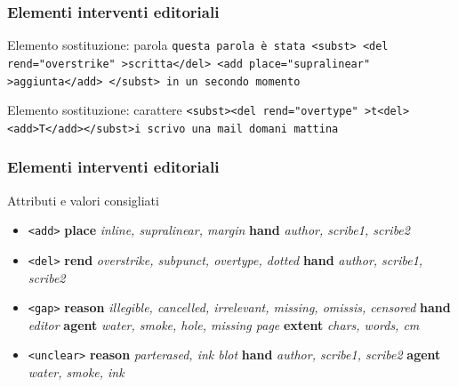 \begin{frame}
    \frametitle{Elementi interventi editoriali}
    \addtocounter{nframe}{1}
    

    \begin{block}{Elemento sostituzione: parola}
        \texttt{questa parola è stata <subst> <del rend="overstrike" >scritta</del> <add place="supralinear" >aggiunta</add> </subst> in un secondo momento}
    \end{block}

    \begin{block}{Elemento sostituzione: carattere}
        \texttt{<subst><del rend="overtype" >t<del><add>T</add></subst>i scrivo una     mail domani mattina}
    \end{block}
   
\end{frame}




\begin{frame}
    \frametitle{Elementi interventi editoriali}
    \addtocounter{nframe}{1}
    

    \begin{block}{Attributi e valori consigliati}
        \begin{itemize}
            \item \texttt{<add>} \textbf{place} \textit{inline, supralinear, margin} \textbf{hand} \textit{author, scribe1, scribe2}
            \item \texttt{<del>} \textbf{rend} \textit{overstrike, subpunct, overtype, dotted} \textbf{hand} \textit{author, scribe1, scribe2}
            \item \texttt{<gap>} \textbf{reason} \textit{illegible, cancelled, irrelevant, missing, omissis, censored} \textbf{hand} \textit{editor} \textbf{agent} \textit{water, smoke, hole, missing page} \textbf{extent} \textit{chars, words, cm}
            \item \texttt{<unclear>} \textbf{reason} \textit{parterased, ink blot} \textbf{hand} \textit{author, scribe1, scribe2} \textbf{agent} \textit{water, smoke, ink}
        \end{itemize}
    \end{block}
    
\end{frame}

